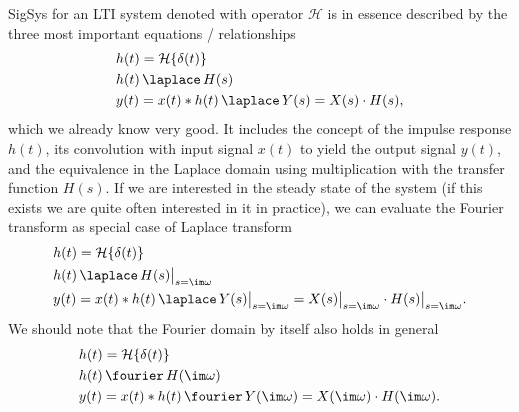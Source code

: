 \begin{mdframed}
SigSys for an LTI system denoted with operator $\mathcal{H}$ is in essence described
by the three most important equations / relationships
\begin{align}
&h(t) = \mathcal{H}\{\delta(t)\}\\
&h(t) \,\laplace\, H(s)\\
&y(t) = x(t) \ast h(t) \,\laplace\, Y(s) = X(s) \cdot H(s),
\end{align}
which we already know very good.
%
It includes the concept of the impulse response $h(t)$, its convolution with input
signal $x(t)$ to yield the output signal $y(t)$, and the equivalence in the Laplace
domain using multiplication with the transfer function $H(s)$.
If we are interested in the steady state of the system
(if this exists we are quite often interested in it in practice),
we can evaluate the Fourier transform as special case of Laplace transform
\begin{align}
&h(t) = \mathcal{H}\{\delta(t)\}\\
&h(t) \,\laplace\, H(s)\big|_{s=\im\omega}\\
&y(t) = x(t) \ast h(t) \,\laplace\, Y(s)\big|_{s=\im\omega} = X(s)\big|_{s=\im\omega} \cdot H(s)\big|_{s=\im\omega}.
\end{align}
%
We should note that the Fourier domain by itself also holds in general
\begin{align}
&h(t) = \mathcal{H}\{\delta(t)\}\\
&h(t) \,\fourier\, H(\im\omega)\\
&y(t) = x(t) \ast h(t) \,\fourier\, Y(\im\omega) = X(\im\omega) \cdot H(\im\omega).
\end{align}
\end{mdframed}

\clearpage

